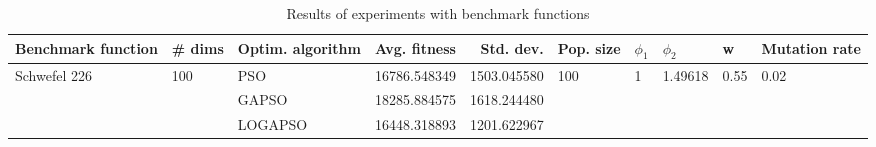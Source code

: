 \begin{table}
\centering
\caption{Results of experiments with benchmark functions}
\begin{tabular}{lllrrlllll}
\toprule
           Benchmark function &              \# dims & Optim. algorithm &  Avg. fitness &   Std. dev. &            Pop. size &         $\phi_{1}$ &               $\phi_{2}$ &                     w &         Mutation rate \\
\midrule
\multirow{3}{*}{Schwefel 226} & \multirow{3}{*}{100} &              PSO &  16786.548349 & 1503.045580 & \multirow{3}{*}{100} & \multirow{3}{*}{1} & \multirow{3}{*}{1.49618} & \multirow{3}{*}{0.55} & \multirow{3}{*}{0.02} \\
                              &                      &            GAPSO &  18285.884575 & 1618.244480 &                      &                    &                          &                       &                       \\
                              &                      &          LOGAPSO &  16448.318893 & 1201.622967 &                      &                    &                          &                       &                       \\
\bottomrule
\end{tabular}
\end{table}
